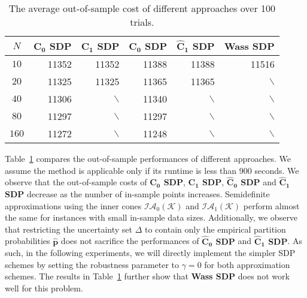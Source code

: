 \documentclass{article}
\begin{document}
\begin{table}[t!]
\color{black}
\centering
\begin{tabular}{|c|rrrrr|}\hline
$N$  & \textbf{$\mathbf{C_0}$ SDP} & \textbf{$\mathbf{C_1}$ SDP}  & \textbf{$\mathbf{\hat{C}_0}$ SDP} & \textbf{$\mathbf{\hat{C}_1}$ SDP} &  \textbf{Wass SDP}  \\
[0.0mm] \hline
$10$  & 11352 & 11352 & 11388 & 11388 & 11516 \\
$20$  & 11325 & 11325 & 11365 & 11365 & $\backslash$ \\
$40$ & 11306 & $\backslash$ & 11340 & $\backslash$ & $\backslash$ \\ 
$80$ & 11297 & $\backslash$ & 11297 & $\backslash$ & $\backslash$ \\
$160$ & 11272 & $\backslash$ & 11248 & $\backslash$ & $\backslash$ \\
\hline\hline
\end{tabular}
\caption[]{The average out-of-sample cost of different approaches over 100 trials.}
\label{tbl:inventory2}
\end{table}

Table~\ref{tbl:inventory2} compares the out-of-sample performances of different approaches. We assume the method is applicable only if its runtime is less than 900 seconds. We observe that the out-of-sample costs of \textbf{$\mathbf{C_0}$ SDP}, \textbf{$\mathbf{C_1}$ SDP}, \textbf{$\mathbf{\hat{C}_0}$ SDP} and \textbf{$\mathbf{\hat{C}_1}$ SDP} decrease as the number of in-sample points increases. Semidefinite approximations using the inner cones $\mathcal{IA}_0\mathcal{(K)}$ and  $\mathcal{IA}_1\mathcal{(K)}$ perform almost the same  for instances with small  in-sample data sizes. Additionally, we observe that restricting the uncertainty set $\Delta$ to contain only the empirical partition probabilities $\hat{\bm p}$ does not sacrifice the performances of \textbf{$\mathbf{\hat{C}_0}$ SDP} and \textbf{$\mathbf{\hat{C}_1}$ SDP}. As such, in the following experiments, we will directly implement the simpler SDP schemes by setting the robustness parameter to $\gamma = 0$ for both approximation schemes. The results in Table~\ref{tbl:inventory2} further show that \textbf{Wass SDP} does not work well for this problem.
\end{document}
